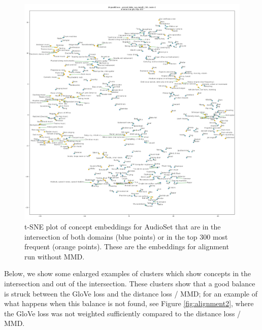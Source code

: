\begin{figure}[H]
    \centering
    \includegraphics[width=\textwidth]{images/results/intersection_top300_tsne_audioset_probabilistic_sup_mmd0_150_AlignedGlove_1.png}
    \caption{
        t-SNE plot of concept embeddings for AudioSet that are in the intersection of both domains (blue points) or in the top 300 most frequent (orange points). These are the embeddings for alignment run without MMD. 
    }
\end{figure}

Below, we show some enlarged examples of clusters which show concepts in the intersection and out of the intersection. These clusters show that a good balance is struck between the GloVe loss and the distance loss / MMD; for an example of what happens when this balance is not found, see Figure \ref{fig:alignment2}, where the GloVe loss was not weighted sufficiently compared to the distance loss / MMD. 


